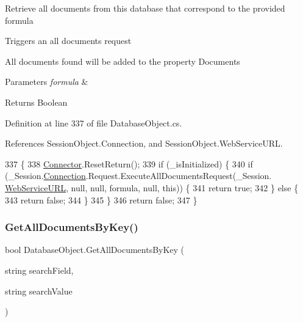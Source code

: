 Retrieve all documents from this database that correspond to the provided formula 

Triggers an all documents request

All documents found will be added to the property \textquotesingle{}Documents\textquotesingle{}


\begin{DoxyParams}{Parameters}
{\em formula} & \\
\hline
\end{DoxyParams}
\begin{DoxyReturn}{Returns}
Boolean
\end{DoxyReturn}


Definition at line 337 of file Database\+Object.\+cs.



References Session\+Object.\+Connection, and Session\+Object.\+Web\+Service\+U\+RL.


\begin{DoxyCode}
337                                                          \{
338         \hyperlink{class_connector}{Connector}.ResetReturn();
339         \textcolor{keywordflow}{if} (\_isInitialized) \{
340             \textcolor{keywordflow}{if} (\_Session.\hyperlink{class_session_object_a014bdbf705a753540e19bfb53030c55c}{Connection}.Request.ExecuteAllDocumentsRequest(\_Session.
      \hyperlink{class_session_object_a697c071c812fbf7ad1166b896fb44c16}{WebServiceURL}, null, null, formula, null, \textcolor{keyword}{this})) \{
341                 \textcolor{keywordflow}{return} \textcolor{keyword}{true};
342             \} \textcolor{keywordflow}{else} \{
343                 \textcolor{keywordflow}{return} \textcolor{keyword}{false};
344             \}
345         \}
346         \textcolor{keywordflow}{return} \textcolor{keyword}{false};
347     \}
\end{DoxyCode}
\mbox{\label{class_database_object_ad4834e7677cd0418969a657eed99653c}} 
\subsubsection{\texorpdfstring{Get\+All\+Documents\+By\+Key()}{GetAllDocumentsByKey()}}
{\footnotesize\ttfamily bool Database\+Object.\+Get\+All\+Documents\+By\+Key (\begin{DoxyParamCaption}\item[{string}]{search\+Field,  }\item[{string}]{search\+Value }\end{DoxyParamCaption})}




